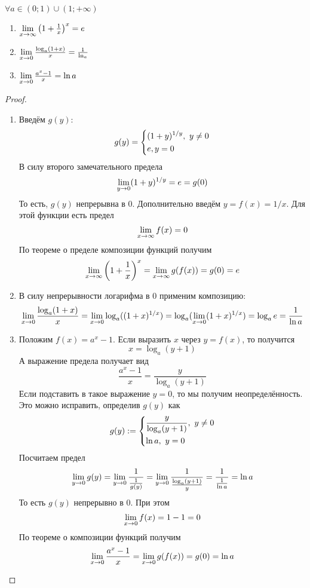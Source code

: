 \begin{lemma}
	$\forall a \in (0; 1) \cup (1; +\infty)$
	\begin{enumerate}
		\item $\lim\limits_{x \to \infty} \left(1 + \frac{1}{x}\right)^x = e$
		\item $\lim\limits_{x \to 0} \frac{\log_a (1 + x)}{x} = \frac{1}{\ln_a}$
		\item $\lim\limits_{x \to 0} \frac{a^x - 1}{x} = \ln a$
	\end{enumerate}
\end{lemma}

\begin{proof}
	\begin{enumerate}
		\item Введём $g(y)$:
		$$
			g(y) = \left\{\begin{aligned}
			&{(1 + y)^{1 / y},\ y \neq 0}
			\\
			&{e, y = 0}
			\end{aligned}\right.
		$$
		В силу второго замечательного предела
		\[
			\lim\limits_{y \to 0} (1 + y)^{1 / y} = e = g(0)
		\]
		То есть, $g(y)$ непрерывна в 0. Дополнительно введём $y = f(x) = 1 / x$. Для этой функции есть предел
		\[
			\lim\limits_{x \to \infty} f(x) = 0
		\]
		По теореме о пределе композиции функций получим
		\[
			\lim\limits_{x \to \infty} \left(1 + \frac{1}{x}\right)^x = \lim\limits_{x \to \infty} g(f(x)) = g(0) = e
		\]
		
		\item В силу непрерывности логарифма в 0 применим композицию:
		$$
			\lim\limits_{x \to 0} \frac{\log_a (1 + x)}{x} = \lim\limits_{x \to 0} \log_a((1 + x)^{1 / x}) = \log_a(\lim\limits_{x \to 0} (1 + x)^{1 / x}) = \log_a e = \frac{1}{\ln a}
		$$
		
		\item Положим $f(x) = a^x - 1$. Если выразить $x$ через $y = f(x)$, то получится
		\[
			x = \log_a (y + 1)
		\]
		А выражение предела получает вид
		\[
			\frac{a^x - 1}{x} = \frac{y}{\log_a (y + 1)}
		\]
		Если подставить в такое выражение $y = 0$, то мы получим неопределённость. Это можно исправить, определив $g(y)$ как
		\[
			g(y) := \left\{\begin{aligned}
				&{\frac{y}{\log_a (y + 1)},\ y \neq 0}
				\\
				&{\ln a,\ y = 0}
			\end{aligned}\right.
		\]
		Посчитаем предел
		\[
			\lim\limits_{y \to 0} g(y) = \lim\limits_{y \to 0} \frac{1}{\frac{1}{g(y)}} = \lim\limits_{y \to 0} \frac{1}{\frac{\log_a (y + 1)}{y}} = \frac{1}{\frac{1}{\ln a}} = \ln a
		\]
		То есть $g(y)$ непрерывно в 0. При этом
		\[
			\lim\limits_{x \to 0} f(x) = 1 - 1 = 0
		\]
		По теореме о композиции функций получим
		\[
			\lim\limits_{x \to 0} \frac{a^x - 1}{x} = \lim\limits_{x \to 0} g(f(x)) = g(0) = \ln a
		\]
	\end{enumerate}
\end{proof}

